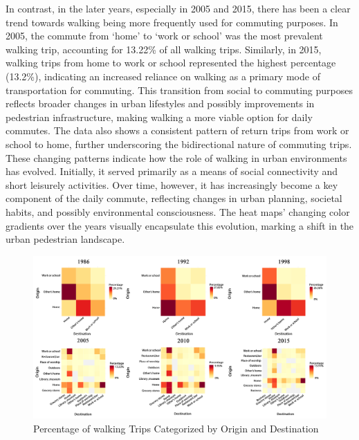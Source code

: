 \documentclass[12pt,twoside]{reedthesis}
\begin{document}
In contrast, in the later years, especially in 2005 and 2015, there has been a clear trend towards walking being more frequently used for commuting purposes. In 2005, the commute from `home' to `work or school' was the most prevalent walking trip, accounting for 13.22\% of all walking trips. Similarly, in 2015, walking trips from home to work or school represented the highest percentage (13.2\%), indicating an increased reliance on walking as a primary mode of transportation for commuting. This transition from social to commuting purposes reflects broader changes in urban lifestyles and possibly improvements in pedestrian infrastructure, making walking a more viable option for daily commutes. The data also shows a consistent pattern of return trips from work or school to home, further underscoring the bidirectional nature of commuting trips.
These changing patterns indicate how the role of walking in urban environments has evolved. Initially, it served primarily as a means of social connectivity and short leisurely activities. Over time, however, it has increasingly become a key component of the daily commute, reflecting changes in urban planning, societal habits, and possibly environmental consciousness. The heat maps' changing color gradients over the years visually encapsulate this evolution, marking a shift in the urban pedestrian landscape.

\clearpage
\newpage
\thispagestyle{empty}
\begin{landscape}
\begin{figure}

{\centering \includegraphics[width=1\linewidth]{heat-w} 

}

\caption{Percentage of walking Trips Categorized by Origin and Destination}\label{fig:heat-w}
\end{figure}
\end{landscape}
\clearpage
\end{document}
